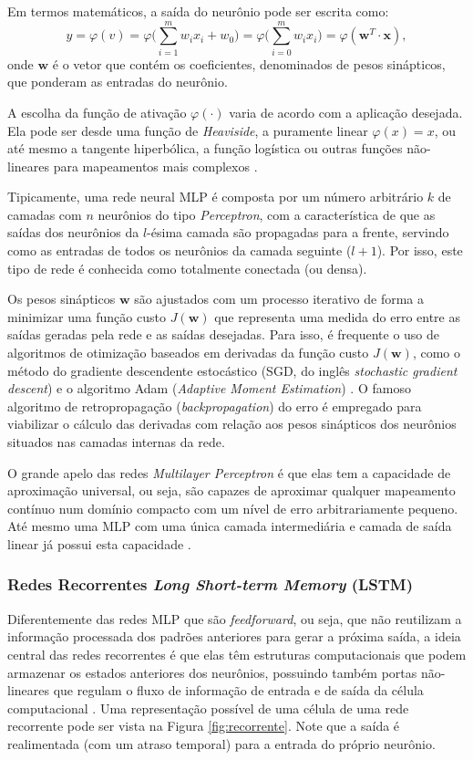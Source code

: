\documentclass[a4paper, 12pt]{article}
\begin{document}
Em termos matemáticos, a saída do neurônio pode ser escrita como:
\begin{equation}
y = \varphi(v) = \varphi  \Big(\sum_{i=1}^{m}w_i x_i + w_0 \Big) = \varphi \Big(\sum_{i=0}^{m}w_i x_i \Big) = \varphi (\mathbf{w}^T \cdot \mathbf{x}),
\end{equation}
onde $\mathbf{w}$ é o vetor que contém os coeficientes, denominados de pesos sinápticos, que ponderam as entradas do neurônio. 

A escolha da função de ativação $\varphi (\cdot)$ varia de acordo com a aplicação desejada. Ela pode ser desde uma função de \textit{Heaviside}, a puramente linear $\varphi(x) = x$, ou até mesmo a tangente hiperbólica, a função logística ou outras funções não-lineares para mapeamentos mais complexos \cite{geron2019hands}. 

Tipicamente, uma rede neural MLP é composta por um número arbitrário $k$ de  camadas com $n$ neurônios do tipo \textit{Perceptron}, com a característica de que as saídas dos neurônios da $l$-ésima camada são propagadas para a frente, servindo como as entradas de todos os neurônios da camada seguinte ($l+1$). Por isso, este tipo de rede é conhecida como totalmente conectada (ou densa).

Os pesos sinápticos $\mathbf{w}$ são ajustados com um processo iterativo de forma a minimizar uma função custo $J(\mathbf{w})$ que representa uma medida do erro entre as saídas geradas pela rede e as saídas desejadas. Para isso, é frequente o uso de algoritmos de otimização baseados em derivadas da função custo $J(\mathbf{w})$, como o método do gradiente descendente estocástico (SGD, do inglês \textit{stochastic gradient descent}) e o algoritmo Adam (\textit{Adaptive Moment Estimation}) \cite{geron2019hands}. O famoso algoritmo de retropropagação (\textit{backpropagation}) do erro é empregado para viabilizar o cálculo das derivadas com relação aos pesos sinápticos dos neurônios situados nas camadas internas da rede. 

O grande apelo das redes \textit{Multilayer Perceptron} é que elas tem a capacidade de aproximação universal, ou seja, são capazes de aproximar qualquer mapeamento contí\-nuo num domínio compacto com um nível de erro arbitrariamente pequeno. Até mesmo uma MLP com uma única camada intermediária e camada de saída linear já possui esta capacidade \cite{cybenko1989approximation}.

\subsubsection{Redes Recorrentes \textit{Long Short-term Memory} (LSTM)}
Diferentemente das redes MLP que são \textit{feedforward}, ou seja, que não reutilizam a informação processada dos padrões anteriores para gerar a próxima saída, a ideia central das redes recorrentes é que elas têm estruturas computacionais que podem armazenar os estados anteriores dos neurônios, possuindo também portas não-lineares que regulam o fluxo de informação de entrada e de saída da célula computacional \cite{haykin2010neural}. Uma representação possível de uma célula de uma rede recorrente pode ser vista na Figura \ref{fig:recorrente}. Note que a saída é realimentada (com um atraso temporal) para a entrada do próprio neurônio.
\end{document}

